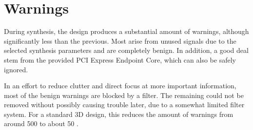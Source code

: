 \section{Warnings}

During synthesis, the design produces a substantial amount of warnings, although significantly less than the previous.
Most arise from unused signals due to the selected synthesis parameters and are completely benign.
In addition, a good deal stem from the provided PCI Express Endpoint Core, which can also be safely ignored.

In an effort to reduce clutter and direct focus at more important information, most of the benign warnings are blocked by a filter.
The remaining could not be removed without possibly causing trouble later, due to a somewhat limited filter system.
For a standard 3D design, this reduces the amount of warnings from around 500 to about 50 \footnotemark.

